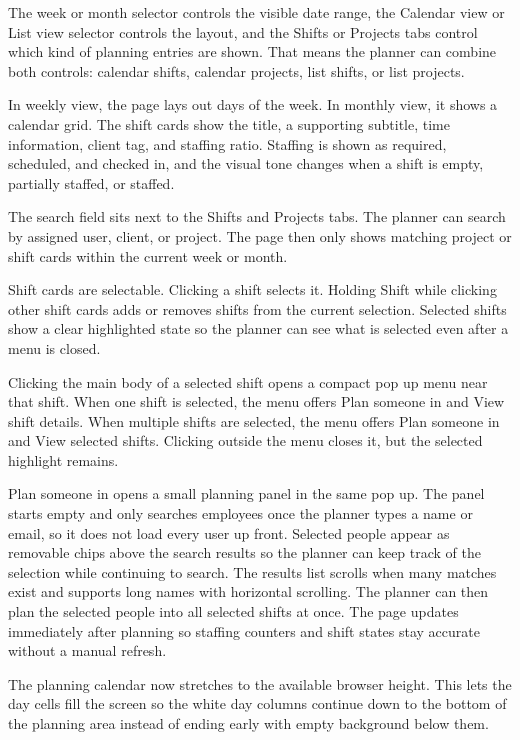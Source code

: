 \documentclass[11pt]{article}
\begin{document}
The week or month selector controls the visible date range, the Calendar view or List view selector controls the layout, and the Shifts or Projects tabs control which kind of planning entries are shown. That means the planner can combine both controls: calendar shifts, calendar projects, list shifts, or list projects.

In weekly view, the page lays out days of the week. In monthly view, it shows a calendar grid. The shift cards show the title, a supporting subtitle, time information, client tag, and staffing ratio. Staffing is shown as required, scheduled, and checked in, and the visual tone changes when a shift is empty, partially staffed, or staffed.

The search field sits next to the Shifts and Projects tabs. The planner can search by assigned user, client, or project. The page then only shows matching project or shift cards within the current week or month.

Shift cards are selectable. Clicking a shift selects it. Holding Shift while clicking other shift cards adds or removes shifts from the current selection. Selected shifts show a clear highlighted state so the planner can see what is selected even after a menu is closed.

Clicking the main body of a selected shift opens a compact pop up menu near that shift. When one shift is selected, the menu offers Plan someone in and View shift details. When multiple shifts are selected, the menu offers Plan someone in and View selected shifts. Clicking outside the menu closes it, but the selected highlight remains.

Plan someone in opens a small planning panel in the same pop up. The panel starts empty and only searches employees once the planner types a name or email, so it does not load every user up front. Selected people appear as removable chips above the search results so the planner can keep track of the selection while continuing to search. The results list scrolls when many matches exist and supports long names with horizontal scrolling. The planner can then plan the selected people into all selected shifts at once. The page updates immediately after planning so staffing counters and shift states stay accurate without a manual refresh.

The planning calendar now stretches to the available browser height. This lets the day cells fill the screen so the white day columns continue down to the bottom of the planning area instead of ending early with empty background below them.
\end{document}
